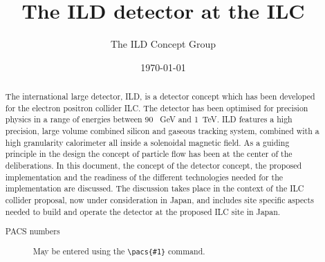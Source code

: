 \documentclass[%
 amsmath,amssymb,
 aps,
]{revtex4-1}
\begin{document}


\title{The ILD detector at the ILC}%

\author{The ILD Concept Group}




\date{\today}%

\begin{abstract}
The international large detector, ILD, is a detector concept which has been developed for the electron positron collider ILC. The detector has been optimised for precision physics in a range of energies between 90 ~GeV and 1~TeV. ILD features a high precision, large volume combined silicon and gaseous tracking system, combined with a high granularity calorimeter all inside a solenoidal magnetic field. As a guiding principle in the design the concept of particle flow has been at the center of the deliberations. In this document, the concept of the detector concept, the proposed implementation and the readiness of the different technologies needed for the implementation are discussed. The discussion takes place in the context of the ILC collider proposal, now under consideration in Japan, and includes site specific aspects needed to build and operate the detector at the proposed ILC site in Japan.

\begin{description}
\item[PACS numbers]
May be entered using the \verb+\pacs{#1}+ command.
\end{description}
\end{abstract}
\end{document}
